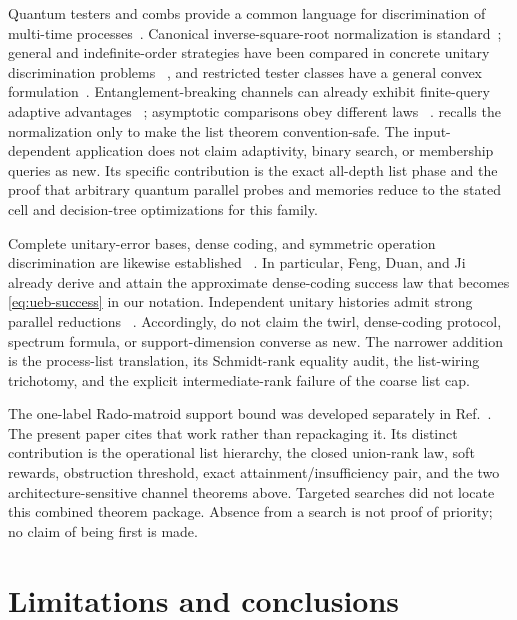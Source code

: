 \documentclass[11pt]{article}
\theoremstyle{definition}
\theoremstyle{remark}
\begin{document}
Quantum testers and combs provide a common language for discrimination of
multi-time processes~\cite{chiribella2009}.  Canonical inverse-square-root
normalization is standard~\cite{sedlak2016}; general and indefinite-order
strategies have been compared in concrete unitary discrimination problems
~\cite{bavaresco2021,bavaresco2022}, and restricted tester classes have a
general convex formulation~\cite{nakahira2021}.  Entanglement-breaking
channels can already exhibit finite-query adaptive advantages
~\cite{harrow2010}; asymptotic comparisons obey different laws
~\cite{salek2022}.   recalls the normalization only to
make the list theorem convention-safe.  The input-dependent application does
not claim adaptivity, binary search, or membership queries as new.  Its
specific contribution is the exact all-depth list phase and the proof that
arbitrary quantum parallel probes and memories reduce to the stated cell and
decision-tree optimizations for this family.

Complete unitary-error bases, dense coding, and symmetric operation
discrimination are likewise established
~\cite{feng2006,sacchi2005,wu2006,zhuang2020}.  In particular, Feng, Duan,
and Ji already derive and attain the approximate dense-coding success law
that becomes \eqref{eq:ueb-success} in our notation.
Independent unitary histories admit strong parallel reductions
~\cite{chiribella2008}.  Accordingly, 
do not claim the twirl, dense-coding protocol, spectrum formula, or
support-dimension converse as new.  The narrower addition is the
process-list translation, its Schmidt-rank equality audit, the list-wiring
trichotomy, and the explicit intermediate-rank failure of the coarse list
cap.

The one-label Rado-matroid support bound was developed separately in
Ref.~\cite{eriksson2026matroid}.  The present paper cites that work rather than
repackaging it.  Its distinct contribution is the operational list hierarchy,
the closed union-rank law, soft rewards, obstruction threshold, exact
attainment/insufficiency pair, and the two architecture-sensitive channel
theorems above.  Targeted searches did not locate this combined theorem
package.  Absence from a search is not proof of priority; no claim of being
first is made.

\section{Limitations and conclusions}\label{sec:limitations}
\end{document}
